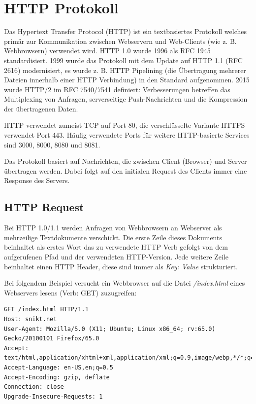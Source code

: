 \section{HTTP Protokoll}

Das Hypertext Transfer Protocol (HTTP) ist ein textbasiertes Protokoll welches primär zur Kommunikation zwischen Webservern und Web-Clients (wie z. B. Webbrowsern) verwendet wird. HTTP 1.0 wurde 1996 als RFC 1945 standardisiert. 1999 wurde das Protokoll mit dem Update auf HTTP 1.1 (RFC 2616) modernisiert, es wurde z. B. HTTP Pipelining (die Übertragung mehrerer Dateien innerhalb einer HTTP Verbindung) in den Standard aufgenommen. 2015 wurde HTTP/2 im RFC 7540/7541 definiert: Verbesserungen betreffen das Multiplexing von Anfragen, serverseitige Push-Nachrichten und die Kompression der übertragenen Daten.

HTTP verwendet zumeist TCP auf Port 80, die verschlüsselte Variante HTTPS verwendet Port 443. Häufig verwendete Ports für weitere HTTP-basierte Services sind 3000, 8000, 8080 und 8081.

Das Protokoll basiert auf Nachrichten, die zwischen Client (Browser) und Server übertragen werden. Dabei folgt auf den initialen Request des Clients immer eine Response des Servers.

\subsection{HTTP Request}

Bei HTTP 1.0/1.1 werden Anfragen von Webbrowsern an Webserver als mehrzeilige Textdokumente verschickt. Die erste Zeile dieses Dokuments beinhaltet als erstes Wort das zu verwendete HTTP Verb gefolgt von dem aufgerufenen Pfad und der verwendeten HTTP-Version. Jede weitere Zeile beinhaltet einen HTTP Header, diese sind immer als \textit{Key: Value} strukturiert.

Bei folgendem Beispiel versucht ein Webbrowser auf die Datei \textit{/index.html} eines Webservers lesens (Verb: GET) zuzugreifen:

\begin{verbatim}
GET /index.html HTTP/1.1
Host: snikt.net
User-Agent: Mozilla/5.0 (X11; Ubuntu; Linux x86_64; rv:65.0) Gecko/20100101 Firefox/65.0
Accept: text/html,application/xhtml+xml,application/xml;q=0.9,image/webp,*/*;q=0.8
Accept-Language: en-US,en;q=0.5
Accept-Encoding: gzip, deflate
Connection: close
Upgrade-Insecure-Requests: 1
\end{verbatim}

